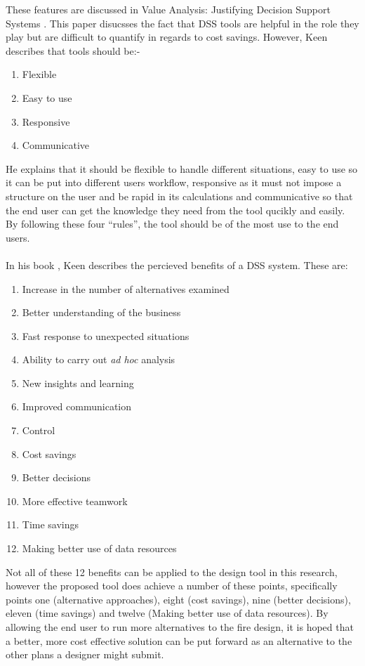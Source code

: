 \documentclass[table,a4paper,oneside]{book}
\begin{document}
These features are discussed in Value Analysis: Justifying Decision Support Systems \citep{Keen1981}. This paper disucsses the fact that \ac{DSS} tools are helpful in the role they play but are difficult to quantify in regards to cost savings. However, Keen describes that tools should be:-

\begin{enumerate}
\item Flexible
\item Easy to use
\item Responsive
\item Communicative
\end{enumerate}

He explains that it should be flexible to handle different situations, easy to use so it can be put into different users workflow, responsive as it must not impose a structure on the user and be rapid in its calculations and communicative so that the end user can get the knowledge they need from the tool qucikly and easily. By following these four ``rules'', the tool should be of the most use to the end users.
\\
\\
In his book \citep{Keen1980} , Keen describes the percieved benefits of a \ac{DSS} system. These are:

\begin{enumerate}
\item Increase in the number of alternatives examined
\item Better understanding of the business
\item Fast response to unexpected situations
\item Ability to carry out \emph{ad hoc} analysis
\item New insights and learning
\item Improved communication
\item Control
\item Cost savings
\item Better decisions
\item More effective teamwork
\item Time savings
\item Making better use of data resources
\end{enumerate}

Not all of these 12 benefits can be applied to the design tool in this research, however the proposed tool does achieve a number of these points, specifically points one (alternative approaches), eight (cost savings), nine (better decisions), eleven (time savings) and twelve (Making better use of data resources). By allowing the end user to run more alternatives to the fire design, it is hoped that a better, more cost effective solution can be put forward as an alternative to the other plans a designer might submit.
\end{document}
